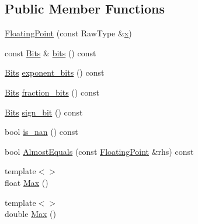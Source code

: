 \subsection*{Public Member Functions}
\begin{DoxyCompactItemize}
\item 
\hyperlink{classtesting_1_1internal_1_1FloatingPoint_a0dabf840863e0df84046f171c891fe71}{Floating\-Point} (const Raw\-Type \&\hyperlink{highgui__c_8h_a6150e0515f7202e2fb518f7206ed97dc}{x})
\item 
const \hyperlink{classtesting_1_1internal_1_1FloatingPoint_abf228bf6cd48f12c8b44c85b4971a731}{Bits} \& \hyperlink{classtesting_1_1internal_1_1FloatingPoint_abead51f16ec6ea84360a976da1cd1387}{bits} () const 
\item 
\hyperlink{classtesting_1_1internal_1_1FloatingPoint_abf228bf6cd48f12c8b44c85b4971a731}{Bits} \hyperlink{classtesting_1_1internal_1_1FloatingPoint_af53c50b85408c582540d6244c026ce2b}{exponent\-\_\-bits} () const 
\item 
\hyperlink{classtesting_1_1internal_1_1FloatingPoint_abf228bf6cd48f12c8b44c85b4971a731}{Bits} \hyperlink{classtesting_1_1internal_1_1FloatingPoint_aa0167b7b10a934b743ba3c1f47421e63}{fraction\-\_\-bits} () const 
\item 
\hyperlink{classtesting_1_1internal_1_1FloatingPoint_abf228bf6cd48f12c8b44c85b4971a731}{Bits} \hyperlink{classtesting_1_1internal_1_1FloatingPoint_a6176cc4d443724477f2799bcbd9f020a}{sign\-\_\-bit} () const 
\item 
bool \hyperlink{classtesting_1_1internal_1_1FloatingPoint_aaef2fd2cd8cdf791206a5e9fed8ef90d}{is\-\_\-nan} () const 
\item 
bool \hyperlink{classtesting_1_1internal_1_1FloatingPoint_adb0fe9ab1d9e5288f8e5550234211166}{Almost\-Equals} (const \hyperlink{classtesting_1_1internal_1_1FloatingPoint}{Floating\-Point} \&rhs) const 
\item 
{\footnotesize template$<$$>$ }\\float \hyperlink{classtesting_1_1internal_1_1FloatingPoint_af2eda9331e679229a1baa3404b57b51d}{Max} ()
\item 
{\footnotesize template$<$$>$ }\\double \hyperlink{classtesting_1_1internal_1_1FloatingPoint_afc2e85c0e886cb13b2300e961c9a9648}{Max} ()
\end{DoxyCompactItemize}
